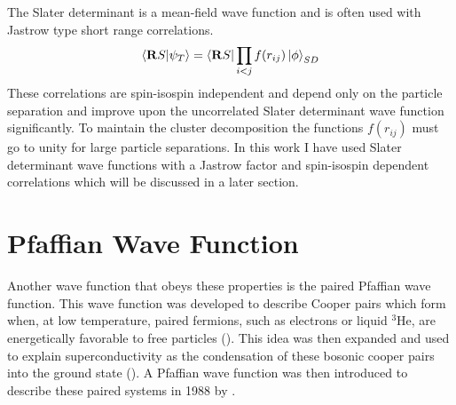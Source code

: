 
The Slater determinant is a mean-field wave function and is often used with Jastrow type short range correlations.
\begin{equation}
   \left< \mathbf{R} S | \psi_T \right> = \left< \mathbf{R} S \right|\prod\limits_{i<j}f(r_{ij}) \left| \phi \right>_{SD}
   \label{equ:jastrow}
\end{equation}
These correlations are spin-isospin independent and depend only on the particle separation and improve upon the uncorrelated Slater determinant wave function significantly. To maintain the cluster decomposition the functions $f(r_{ij})$ must go to unity for large particle separations. In this work I have used Slater determinant wave functions with a Jastrow factor and spin-isospin dependent correlations which will be discussed in a later section.

\section{Pfaffian Wave Function}
Another wave function that obeys these properties is the paired Pfaffian wave function. This wave function was developed to describe Cooper pairs which form when, at low temperature, paired fermions, such as electrons or liquid $^3$He, are energetically favorable to free particles (\cite{cooper1956,leggett1975}). This idea was then expanded and used to explain superconductivity as the condensation of these bosonic cooper pairs into the ground state (\cite{bardeen1957,bardeen1957_2}). A Pfaffian wave function was then introduced to describe these paired systems in 1988 by \cite{bouchaud1988}.

